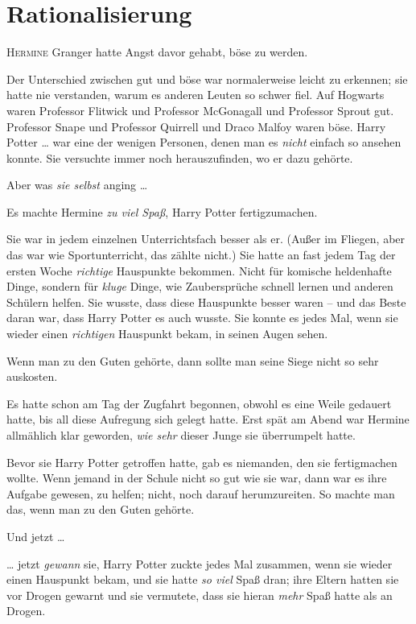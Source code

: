 \chapter{Rationalisierung}

\lettrine{H}{ermine} Granger hatte Angst davor gehabt, böse zu werden. 

Der Unterschied zwischen gut und böse war normalerweise leicht zu erkennen; sie hatte nie verstanden, warum es anderen Leuten so schwer fiel. Auf Hogwarts waren Professor Flitwick und Professor McGonagall und Professor Sprout gut. Professor Snape und Professor Quirrell und Draco Malfoy waren böse. Harry Potter … war eine der wenigen Personen, denen man es \emph{nicht} einfach so ansehen konnte. Sie versuchte immer noch herauszufinden, wo er dazu gehörte. 

Aber was \emph{sie selbst} anging … 

Es machte Hermine \emph{zu viel Spaß}, Harry Potter fertigzumachen. 

Sie war in jedem einzelnen Unterrichtsfach besser als er. (Außer im Fliegen, aber das war wie Sportunterricht, das zählte nicht.) Sie hatte an fast jedem Tag der ersten Woche \emph{richtige} Hauspunkte bekommen. Nicht für komische heldenhafte Dinge, sondern für \emph{kluge} Dinge, wie Zaubersprüche schnell lernen und anderen Schülern helfen. Sie wusste, dass diese Hauspunkte besser waren – und das Beste daran war, dass Harry Potter es auch wusste. Sie konnte es jedes Mal, wenn sie wieder einen \emph{richtigen} Hauspunkt bekam, in seinen Augen sehen. 

Wenn man zu den Guten gehörte, dann sollte man seine Siege nicht so sehr auskosten. 

Es hatte schon am Tag der Zugfahrt begonnen, obwohl es eine Weile gedauert hatte, bis all diese Aufregung sich gelegt hatte. Erst spät am Abend war Hermine allmählich klar geworden, \emph{wie sehr} dieser Junge sie überrumpelt hatte. 

Bevor sie Harry Potter getroffen hatte, gab es niemanden, den sie fertigmachen wollte. Wenn jemand in der Schule nicht so gut wie sie war, dann war es ihre Aufgabe gewesen, zu helfen; nicht, noch darauf herumzureiten. So machte man das, wenn man zu den Guten gehörte. 

Und jetzt … 

… jetzt \emph{gewann} sie, Harry Potter zuckte jedes Mal zusammen, wenn sie wieder einen Hauspunkt bekam, und sie hatte \emph{so viel} Spaß dran; ihre Eltern hatten sie vor Drogen gewarnt und sie vermutete, dass sie hieran \emph{mehr} Spaß hatte als an Drogen. 

